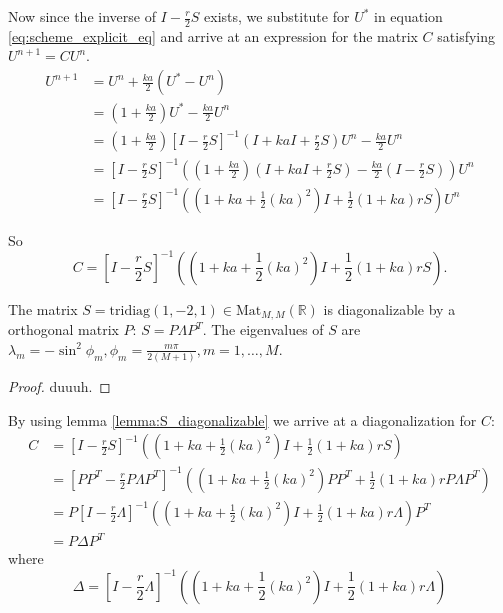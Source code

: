 Now since the inverse of \( I - \frac{r}{2}S \) exists,
we substitute for \( U^* \)
in equation \ref{eq:scheme_explicit_eq}
and arrive at an expression for the matrix \( C \)
satisfying \( U^{n+1} = C U^n \).
\begin{align*}
  U^{n+1} &= U^n + \frac{ka}{2}\left(U^*  - U^n\right) \\
          &= \left(1 + \frac{ka}{2}\right) U^* - \frac{ka}{2}U^n \\
          &= \left(1 + \frac{ka}{2}\right) {\left[I - \frac{r}{2}S\right]}^{-1} \left(I + kaI + \frac{r}{2}S\right) U^n - \frac{ka}{2}U^n \\
          &= {\left[I - \frac{r}{2}S\right]}^{-1} \left(\left(1 + \frac{ka}{2}\right)\left(I + kaI + \frac{r}{2}S\right) - \frac{ka}{2}\left(I-\frac{r}{2}S\right)\right) U^n \\
          &= {\left[I - \frac{r}{2}S\right]}^{-1} \left( \left(1+ka+\frac{1}{2}(ka)^2\right)I + \frac{1}{2}\left(1+ka\right)rS\right) U^n
\end{align*}

So
\begin{equation}
    C = {\left[I - \frac{r}{2}S\right]}^{-1} \left( \left(1+ka+\frac{1}{2}(ka)^2\right)I + \frac{1}{2}\left(1+ka\right)rS\right).
  \end{equation}

\begin{lemma}
  \label{lemma:S_diagonalizable}
  The matrix \( S = \text{tridiag}(1, -2, 1) \in \text{Mat}_{M, M}(\mathbb{R}) \)
  is diagonalizable by a orthogonal matrix \( P \): \( S = P \Lambda P^T \).
  The eigenvalues of \( S \) are
  \( \lambda_m = - \sin^2 \phi_m, \phi_m = \frac{m \pi}{2(M+1)}, m = 1, \dots, M\).
\end{lemma}
\begin{proof}
    duuuh.
\end{proof}

By using lemma \ref{lemma:S_diagonalizable} we arrive at a diagonalization for \( C \):
\begin{align*}
  C &= {\left[I - \frac{r}{2}S\right]}^{-1} \left( \left(1+ka+\frac{1}{2}(ka)^2\right)I + \frac{1}{2}\left(1+ka\right)rS\right) \\
    &= {\left[PP^T - \frac{r}{2}P\Lambda P^T\right]}^{-1} \left( \left(1+ka+\frac{1}{2}(ka)^2\right)PP^T + \frac{1}{2}\left(1+ka\right)r P\Lambda P^T\right) \\
    &= P{\left[I - \frac{r}{2}\Lambda \right]}^{-1} \left( \left(1+ka+\frac{1}{2}(ka)^2\right)I + \frac{1}{2}\left(1+ka\right)r \Lambda \right) P^T \\
    &= P \Delta P^T
\end{align*}
where
\begin{equation}
    \Delta = {\left[I - \frac{r}{2}\Lambda \right]}^{-1} \left( \left(1+ka+\frac{1}{2}(ka)^2\right)I + \frac{1}{2}\left(1+ka\right)r \Lambda \right)
\end{equation}

